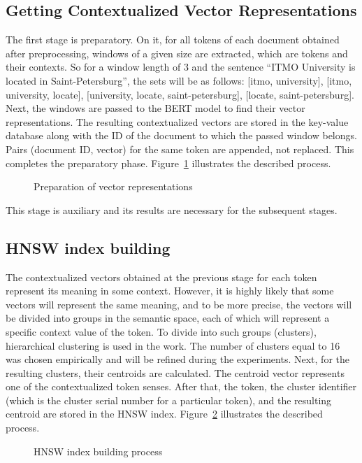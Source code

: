 \documentclass[
    twocolumn,
]{template/ceurart}
\begin{document}
    \subsection{Getting Contextualized Vector Representations}
    The first stage is preparatory.
    On it, for all tokens of each document obtained after preprocessing,
    windows of a given size are extracted, which are tokens and their contexts.
    So for a window length of 3 and the sentence ``ITMO University is located in Saint-Petersburg'',
    the sets will be as follows: [itmo, university], [itmo, university, locate],
    [university, locate, saint-petersburg], [locate, saint-petersburg].
    Next, the windows are passed to the BERT model to find their vector representations.
    The resulting contextualized vectors are stored in the key-value database
    along with the ID of the document to which the passed window belongs.
    Pairs (document ID, vector) for the same token are appended, not replaced.
    This completes the preparatory phase.
    Figure~\ref{fig:storeVectors} illustrates the described process.
    \begin{figure}
        \centering
        
        \caption{Preparation of vector representations}
        \label{fig:storeVectors}
    \end{figure}

    This stage is auxiliary and its results are necessary for the subsequent stages.
    
    \subsection{HNSW index building}
    The contextualized vectors obtained at the previous stage for each token represent its meaning in some context.
    However, it is highly likely that some vectors will represent the same meaning, and to be more precise,
    the vectors will be divided into groups in the semantic space,
    each of which will represent a specific context value of the token.
    To divide into such groups (clusters), hierarchical clustering is used in the work.
    The number of clusters equal to 16 was chosen empirically and will be refined during the experiments.
    Next, for the resulting clusters, their centroids are calculated.
    The centroid vector represents one of the contextualized token senses.
    After that, the token, the cluster identifier (which is the cluster serial number for a particular token),
    and the resulting centroid are stored in the HNSW index.
    Figure~\ref{fig:hnswIndexBuilding} illustrates the described process.
    \begin{figure}
        \centering
        
        \caption{HNSW index building process}
        \label{fig:hnswIndexBuilding}
    \end{figure}
\end{document}
